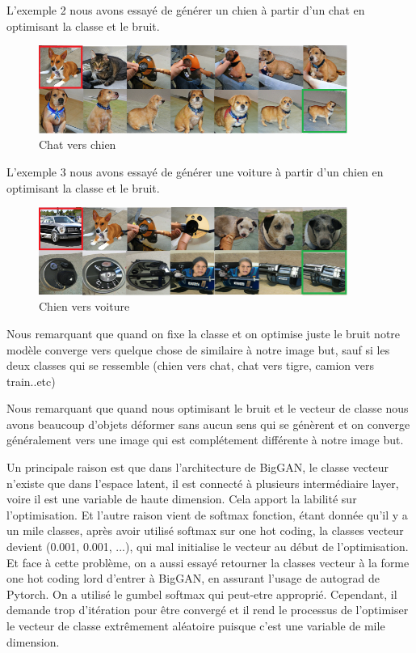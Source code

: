 L'exemple 2 nous avons essayé de générer un chien à partir d'un chat en optimisant la classe et le bruit.
\begin{figure}[H] 
	\centering 
	\includegraphics[width=0.9\textwidth]{./resources/img/cat2dog_1.png} %
	\caption{Chat vers chien} %
\end{figure}

L'exemple 3 nous avons essayé de générer une voiture à partir d'un chien en optimisant la classe et le bruit.
\begin{figure}[H] 
	\centering 
	\includegraphics[width=0.9\textwidth]{./resources/img/dog2car_1.png} %
	\caption{Chien vers voiture} %
\end{figure}

Nous remarquant que quand on fixe la classe et on optimise juste le bruit notre modèle converge vers quelque chose de similaire à notre image but, sauf si les deux classes qui se ressemble (chien vers chat, chat vers tigre, camion vers train..etc)

Nous remarquant que quand nous optimisant le bruit et le vecteur de classe nous avons beaucoup d'objets déformer sans aucun sens qui se génèrent et on converge généralement vers une image qui est complétement différente à notre image but. 

Un principale raison est que dans l'architecture de BigGAN, le classe vecteur n'existe que dans l'espace latent, il est connecté à plusieurs intermédiaire layer, voire il est une variable de haute dimension. Cela apport la labilité sur l'optimisation. Et l'autre raison vient de softmax fonction, étant donnée qu'il y a un mile classes, après avoir utilisé softmax sur one hot coding, la classes vecteur devient (0.001,  0.001, ...), qui mal initialise le vecteur au début de l'optimisation. Et face à cette problème, on a aussi essayé retourner la classes vecteur à la forme one hot coding lord d'entrer à BigGAN, en assurant l'usage de autograd de Pytorch. On a utilisé le gumbel softmax qui peut-etre approprié. Cependant, il demande trop d'itération pour être convergé et il rend le processus de l'optimiser le vecteur de classe extrêmement aléatoire puisque c'est une variable de mile dimension.

